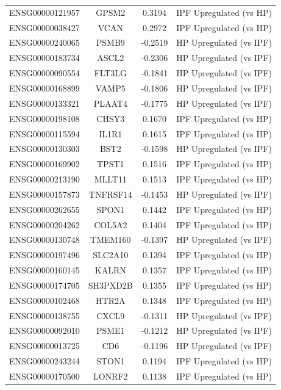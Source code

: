 \documentclass[
]{article}
\begin{document}
\begin{singlespace}
\begin{longtable}[t]{lccc}
\endfoot
\bottomrule
\endlastfoot
ENSG00000121957 & GPSM2 & 0.3194 & IPF Upregulated (vs HP)\\
ENSG00000038427 & VCAN & 0.2972 & IPF Upregulated (vs HP)\\
ENSG00000240065 & PSMB9 & -0.2519 & HP Upregulated (vs IPF)\\
ENSG00000183734 & ASCL2 & -0.2306 & HP Upregulated (vs IPF)\\
ENSG00000090554 & FLT3LG & -0.1841 & HP Upregulated (vs IPF)\\
\addlinespace
ENSG00000168899 & VAMP5 & -0.1806 & HP Upregulated (vs IPF)\\
ENSG00000133321 & PLAAT4 & -0.1775 & HP Upregulated (vs IPF)\\
ENSG00000198108 & CHSY3 & 0.1670 & IPF Upregulated (vs HP)\\
ENSG00000115594 & IL1R1 & 0.1615 & IPF Upregulated (vs HP)\\
ENSG00000130303 & BST2 & -0.1598 & HP Upregulated (vs IPF)\\
\addlinespace
ENSG00000169902 & TPST1 & 0.1516 & IPF Upregulated (vs HP)\\
ENSG00000213190 & MLLT11 & 0.1513 & IPF Upregulated (vs HP)\\
ENSG00000157873 & TNFRSF14 & -0.1453 & HP Upregulated (vs IPF)\\
ENSG00000262655 & SPON1 & 0.1442 & IPF Upregulated (vs HP)\\
ENSG00000204262 & COL5A2 & 0.1404 & IPF Upregulated (vs HP)\\
\addlinespace
ENSG00000130748 & TMEM160 & -0.1397 & HP Upregulated (vs IPF)\\
ENSG00000197496 & SLC2A10 & 0.1394 & IPF Upregulated (vs HP)\\
ENSG00000160145 & KALRN & 0.1357 & IPF Upregulated (vs HP)\\
ENSG00000174705 & SH3PXD2B & 0.1355 & IPF Upregulated (vs HP)\\
ENSG00000102468 & HTR2A & 0.1348 & IPF Upregulated (vs HP)\\
\addlinespace
ENSG00000138755 & CXCL9 & -0.1311 & HP Upregulated (vs IPF)\\
ENSG00000092010 & PSME1 & -0.1212 & HP Upregulated (vs IPF)\\
ENSG00000013725 & CD6 & -0.1196 & HP Upregulated (vs IPF)\\
ENSG00000243244 & STON1 & 0.1194 & IPF Upregulated (vs HP)\\
ENSG00000170500 & LONRF2 & 0.1138 & IPF Upregulated (vs HP)\\

\end{longtable}
\end{singlespace}
\end{document}

